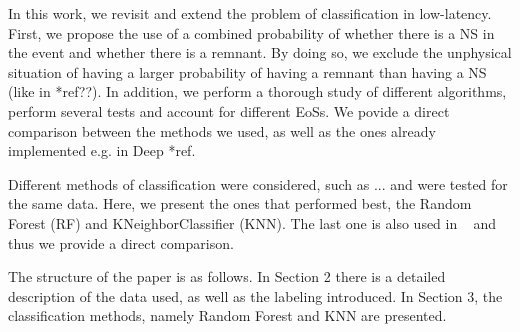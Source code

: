 In this work, we revisit and extend the problem of classification in low-latency. First, we propose the use of a combined probability of whether there is a NS in the event and whether there is a remnant. By doing so, we exclude the unphysical situation of having a larger probability of having a remnant than having a NS (like in *ref??). In addition, we perform a thorough study of different algorithms, perform several tests and account for different EoSs. We povide a direct comparison between the methods we used, as well as the ones already implemented e.g. in Deep *ref. 

Different methods of classification were considered, such as ... and were tested for the same data. Here, we present the ones that performed best, the Random Forest (RF) and KNeighborClassifier (KNN). The last one is also used in ~\cite{Chatterjee:2019avs} and thus we provide a direct comparison. 

The structure of the paper is as follows. In Section 2 there is a detailed description of the data used, as well as the labeling introduced. In Section 3, the classification methods, namely Random Forest and KNN are presented. 
